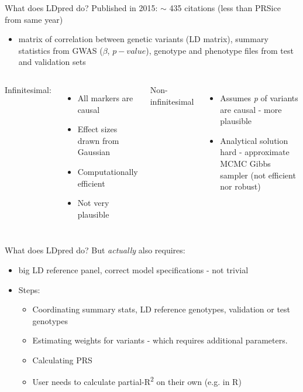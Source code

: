 \documentclass{beamer}
\begin{document}
    \begin{frame}[t]{What does LDpred do?}
        Published in 2015:  $\sim$ 435 citations (less than PRSice from same year)
        \begin{itemize}

            \item matrix of correlation between genetic variants (LD matrix), summary statistics from GWAS ($\beta$, $p-value$), genotype and phenotype files from test and validation sets 
                \end{itemize}
                \begin{columns}[t, onlytextwidth]
    \textcolor{example}{Infinitesimal:}
    \begin{itemize}
        \item All markers are causal
        \item Effect sizes drawn from Gaussian
        \item  Computationally efficient
        \item Not very plausible 
    \end{itemize}
     \textcolor{example}{Non-infinitesimal}
    
   \begin{itemize}
    
    \item  Assumes \emph{p} of variants are causal - more plausible 
  
     \item Analytical solution hard - approximate MCMC Gibbs sampler (not efficient nor robust)
     \end{itemize}
     \end{columns}
    \end{frame}

\begin{frame}[t]{What does LDpred do?}
But \emph{actually} also requires:
\begin{itemize}
        \item big LD reference panel, correct model specifications  - not trivial
        \item Steps:
            \begin{itemize}
                \item Coordinating summary stats, LD reference genotypes, validation or test genotypes
                \item Estimating weights for variants - which requires additional parameters.
                \item Calculating PRS 
                \item User needs to calculate partial-R\textsuperscript{2} on their own (e.g. in R)
        \end{itemize}
    \end{itemize}
\end{frame}
\end{document}
